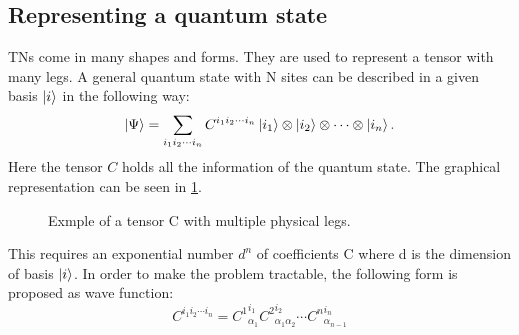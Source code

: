 \subsection{Representing a quantum state}

\Glspl{TN} come in many shapes and forms. They are used to represent a tensor with many legs. A general quantum state with N sites can be described in a given basis $\ket{i}$ in the following way:
\begin{equation}
    \ket{\Psi} = \sum_{i_1 i_2 \cdots i_n } C^{i_1 i_2 \cdots i_n} \ket{i_1} \otimes \ket{i_2} \otimes \cdots \otimes \ket{i_n} .
\end{equation}
Here the tensor $C$ holds all the information of the quantum state. The graphical representation can be seen in \cref{fig:tens:intro:C}.
\begin{figure}[!htbp]
    \centering


    \caption{Exmple of a tensor C with multiple physical legs.}
    \label{fig:tens:intro:C}
\end{figure}
\noindent
This requires an exponential number $d^n$ of coefficients C where d is the dimension of basis $\ket{i}$. In order to make the problem tractable, the following form is proposed as wave function:
\begin{equation}
    C^{i_1 i_2 \cdots i_n} = {C^{1}}_{\alpha_1}^{ i_1} {C^{2}}_{\alpha_1 \alpha_2}^{i_2} \cdots  {C^{n}}_{\alpha_{n-1} }^{i_n}
\end{equation}

